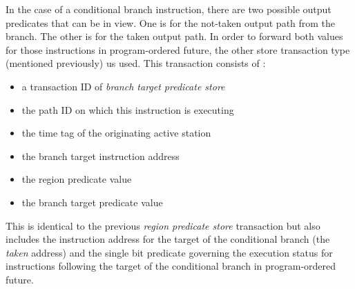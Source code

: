 \documentclass[10pt,dvips]{article}
\begin{document}
In the case of a conditional branch instruction,
there are two possible output predicates that can be in
view.  One is for the not-taken output path from the branch.
The other is for the taken output path.
In order to forward both values for those instructions
in program-ordered future, the other store transaction
type (mentioned previously) us used.
This transaction consists of :
%
\begin{itemize}
\vspace{-0.05in}
\item{a transaction ID of \textit{branch target predicate store}}
\vspace{-0.05in}
\item{the path ID on which this instruction is executing}
\vspace{-0.05in}
\item{the time tag of the originating active station}
\vspace{-0.05in}
\item{the branch target instruction address}
\vspace{-0.05in}
\item{the region predicate value}
\vspace{-0.05in}
\item{the branch target predicate value}
\vspace{-0.05in}
\end{itemize}   
%
This is identical to the previous \textit{region predicate store}
transaction but also includes the instruction address
for the target of the conditional branch (the \textit{taken} address)
and the single bit predicate
governing the execution status for instructions
following the target of the conditional branch in program-ordered
future.
\end{document}

